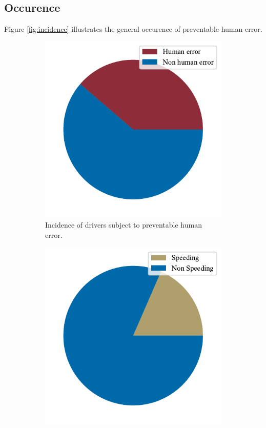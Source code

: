 \documentclass{article}
\theoremstyle{plain}
\theoremstyle{definition}
\theoremstyle{remark}
\begin{document}
\subsection{Occurence}
Figure \ref{fig:incidence} illustrates the general occurence of preventable human error.
\begin{figure}[ht]
	\vskip 0.2in
	\centering
		\begin{subfigure}[ht]{0.49\columnwidth}
			\includegraphics[width=\columnwidth]{plots/err-incidence-total}
			\caption{Incidence of drivers subject to preventable human error.}
			\label{fig:err-incidence-total}
		\end{subfigure}
		\hfill
		\begin{subfigure}[ht]{0.49\columnwidth}
			\includegraphics[width=\columnwidth]{plots/err-incidence-speeding}

\end{subfigure}
\end{figure}
\end{document}
